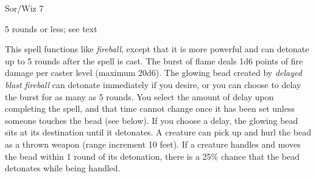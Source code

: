 
\begin{description*}
\item[Level:] Sor/Wiz 7
\item[Duration:] 5 rounds or less; see text
\end{description*}

This spell functions like \textit{fireball}, except that it is more powerful and
can detonate up to 5 rounds after the spell is cast. The burst of flame deals 1d6
points of fire damage per caster level (maximum 20d6).
The glowing bead created by \textit{delayed blast fireball} can detonate immediately
if you desire, or you can choose to delay the burst for as many as 5 rounds. You
select the amount of delay upon completing the spell, and that time cannot change
once it has been set unless someone touches the bead (see below). If you choose
a delay, the glowing bead sits at its destination until it detonates. A creature
can pick up and hurl the bead as a thrown weapon (range increment 10 feet). If
a creature handles and moves the bead within 1 round of its detonation, there is
a 25\% chance that the bead detonates while being handled.